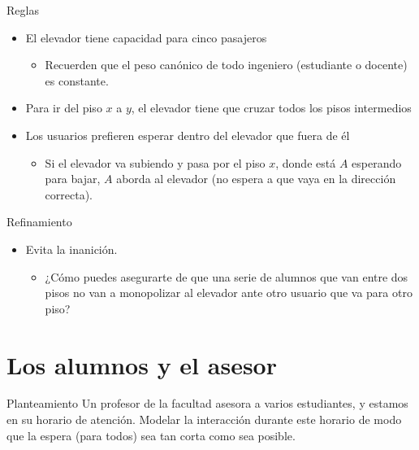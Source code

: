 \documentclass[presentation]{beamer}
\begin{document}
\begin{frame}[label={sec:org5edae39}]{Reglas}
\begin{itemize}
\item El elevador tiene capacidad para cinco pasajeros
\begin{itemize}
\item Recuerden que el peso canónico de todo ingeniero (estudiante o
docente) es constante.
\end{itemize}
\item Para ir del piso \(x\) a \(y\), el elevador tiene que cruzar todos los
pisos intermedios
\item Los usuarios prefieren esperar dentro del elevador que fuera de él
\begin{itemize}
\item Si el elevador va subiendo y pasa por el piso \(x\), donde está \(A\)
esperando para bajar, \(A\) aborda al elevador (no espera a que vaya
en la dirección correcta).
\end{itemize}
\end{itemize}
\end{frame}

\begin{frame}[label={sec:org19f0040}]{Refinamiento}
\begin{itemize}
\item Evita la inanición.
\begin{itemize}
\item ¿Cómo puedes asegurarte de que una serie de alumnos que van entre
dos pisos no van a monopolizar al elevador ante otro usuario que
va para otro piso?
\end{itemize}
\end{itemize}
\end{frame}

\section{Los alumnos y el asesor}
\label{sec:org5ca146a}
\begin{frame}[label={sec:org671c791}]{Planteamiento}
\vfill
Un profesor de la facultad asesora a varios estudiantes, y estamos en
su horario de atención.
\vfill
Modelar la interacción durante este horario de modo que la espera
(para todos) sea tan corta como sea posible.
\end{frame}
\end{document}
